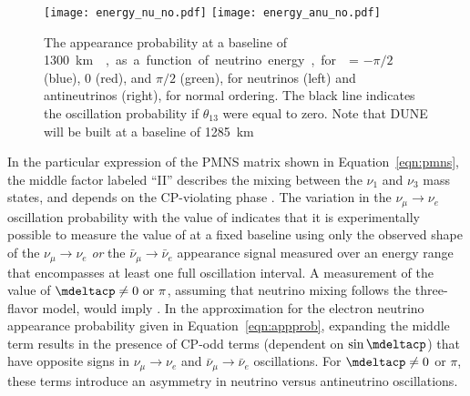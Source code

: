 \begin{figure}
  \centering
\texttt{[image: energy\_nu\_no.pdf]}
\texttt{[image: energy\_anu\_no.pdf]}
  \caption[Appearance probabilities for \nue and \anue at \SI{1300}{\km}]{The appearance probability at a baseline of \SI{1300}\km{},
  as a function of neutrino energy, for \deltacp = $-\pi/2$ (blue), 
  0 (red), and $\pi/2$ (green), for neutrinos (left) and antineutrinos
  (right), for normal ordering. The black line indicates the oscillation
  probability if $\theta_{13}$ were equal to zero. Note that DUNE will be built at a baseline of \SI{1285}\km{}}
  \label{fig:oscprob}
\end{figure}

In the particular expression of the PMNS matrix shown in
Equation~\ref{eqn:pmns}, the middle factor labeled ``II'' describes
the mixing between the $\nu_1$ and $\nu_3$ mass states, and depends on
the CP-violating phase \deltacp. The variation in the $\nu_\mu \rightarrow
\nu_e$ oscillation probability with the value of \deltacp
indicates that it is experimentally possible to measure the value of
\deltacp at a fixed baseline using only the observed shape of the
$\nu_\mu \rightarrow \nu_e$ {\em or} the 
$\bar{\nu}_\mu \rightarrow \bar{\nu}_e$
appearance signal measured over an energy range that encompasses at
least one full oscillation interval. A measurement of the value of
$\mdeltacp \neq 0 \ {\rm or} \ \pi$, assuming that neutrino mixing follows the three-flavor model, would imply . In the approximation for the electron neutrino appearance
probability given in Equation~\ref{eqn:appprob}, expanding the middle
term results in the presence of CP-odd terms (dependent on $\sin
\mdeltacp$) that have opposite signs in $\nu_{\mu} \rightarrow \nu_e$
and $\bar{\nu}_{\mu} \rightarrow \bar{\nu}_e$ oscillations.
For $\mdeltacp \neq 0$ or $\pi$, these terms introduce an asymmetry in
neutrino versus antineutrino oscillations. 
